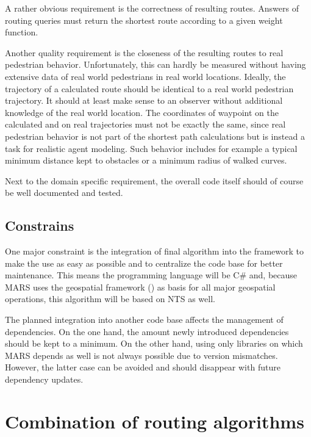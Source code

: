 		A rather obvious requirement is the correctness of resulting routes.
		Answers of routing queries must return the shortest route according to a given weight function.
		
		Another quality requirement is the closeness of the resulting routes to real pedestrian behavior.
		Unfortunately, this can hardly be measured without having extensive data of real world pedestrians in real world locations.
		Ideally, the trajectory of a calculated route should be identical to a real world pedestrian trajectory.
		It should at least make sense to an observer without additional knowledge of the real world location.
		The coordinates of waypoint on the calculated and on real trajectories must not be exactly the same, since real pedestrian behavior is not part of the shortest path calculations but is instead a task for realistic agent modeling.
		Such behavior includes for example a typical minimum distance kept to obstacles or a minimum radius of walked curves.

		Next to the domain specific requirement, the overall code itself should of course be well documented and tested.
	
	\subsection{Constrains}
	\label{subsec:constrains}
		
		One major constraint is the integration of final algorithm into the  framework to make the use as easy as possible and to centralize the code base for better maintenance.
		This means the programming language will be C\# and, because MARS uses the geospatial framework  () as basis for all major geospatial operations, this algorithm will be based on NTS as well.
		
		The planned integration into another code base affects the management of dependencies.
		On the one hand, the amount newly introduced dependencies should be kept to a minimum.
		On the other hand, using only libraries on which MARS depends as well is not always possible due to version mismatches.
		However, the latter case can be avoided and should disappear with future dependency updates.
	
\section{Combination of routing algorithms}
\label{sec:combining-routing-algorithms}

